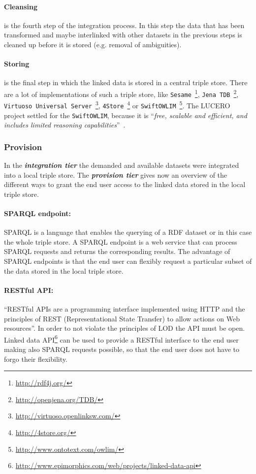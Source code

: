 \documentclass{article}
\begin{document}
\paragraph{Cleansing} is the fourth step of the integration process. In this step the data that has been transformed and maybe interlinked with other datasets in the previous steps is cleaned up before it is stored (e.g. removal of ambiguities).

\paragraph{Storing} is the final step in which the linked data is stored in a central triple store. There are a lot of implementations of such a triple store, like 
\texttt{Sesame}~\footnote{\url{http://rdf4j.org/}}, 
\texttt{Jena TDB}~\footnote{\url{http://openjena.org/TDB/}},
\texttt{Virtuoso Universal Server}~\footnote{\url{http://virtuoso.openlinksw.com/}},
\texttt{4Store}~\footnote{\url{http://4store.org/}} or 
\texttt{SwiftOWLIM}~\footnote{\url{http://www.ontotext.com/owlim/}}. The LUCERO project settled for the \texttt{SwiftOWLIM}, because it is ``\textit{free, scalable and efficient, and includes limited reasoning capabilities}''~\cite{daquin_lucero_2010-1}.

\subsubsection{Provision}
\label{technical-architecture-challenges:proposal:provision}
In the \textit{\textbf{integration tier}} the demanded and available datasets were integrated into a local triple store. The \textit{\textbf{provision tier}} gives now an overview of the different ways to grant the end user access to the linked data stored in the local triple store.

\paragraph{SPARQL endpoint:} SPARQL is a language that enables the querying of a RDF dataset or in this case the whole triple store. A SPARQL endpoint is a web service that can process SPARQL requests and returns the corresponding results. The advantage of SPARQL endpoints is that the end user can flexibly request a particular subset of the data stored in the local triple store.

\paragraph{RESTful API:} \enquote{RESTful APIs are a programming interface implemented using HTTP and the principles of REST (Representational State Transfer) to allow actions on Web resources}.\cite{hyland_linked_????}
In order to not violate the principles of LOD the API must be open. Linked data API\footnote{\url{http://www.epimorphics.com/web/projects/linked-data-api}} can be used to provide a RESTful interface to the end user making also SPARQL requests possible, so that the end user does not have to forgo their flexibility.
\end{document}
